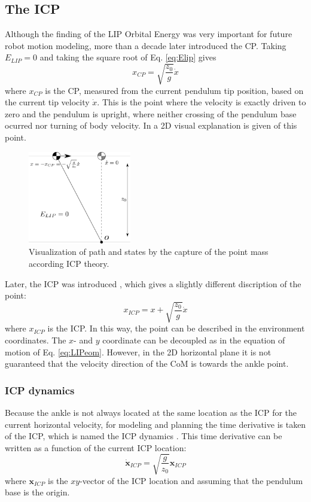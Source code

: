 \subsection{The \acf{ICP}}
Although the finding of the \ac{LIP} Orbital Energy was very important for future robot motion modeling, more than a decade later \cite{pratt2006capture} introduced the \ac{CP}. Taking $E_{LIP}=0$ and taking the square root of Eq.  \eqref{eq:Elip} gives
\begin{equation}
x_{CP}=\sqrt{ \frac{z_0}{g}}\dot{x} 
\label{eq:cp}
\end{equation}
where $x_{CP}$ is the \ac{CP}, measured from the current pendulum tip position, based on the current tip velocity $\dot{x}$. This is the point where the velocity is exactly driven to zero and the pendulum is upright, where neither crossing of the pendulum base ocurred nor turning of body velocity. In  a \ac{2D} visual explanation is given of this point.
\begin{figure}[h]
\centering
\includegraphics[width=0.4\textwidth]{STYLESTUFF/2DICP.png}
\caption{Visualization of path and states by the capture of the point mass according \ac{ICP} theory.}
\label{fig:2dicp}
\end{figure}
Later, the \ac{ICP} was introduced \cite{koolen2012capturability}, which gives a slightly different discription of the point:
\begin{equation}
x_{ICP}=x+\sqrt{ \frac{z_0}{g}}\dot{x} 
\label{eq:icp}
\end{equation}
where $x_{ICP}$ is the \ac{ICP}. In this way, the point can be described in the environment coordinates.
The $x$- and $y$ coordinate can be decoupled as in the equation of motion of Eq. \eqref{eq:LIPeom}. However, in the \ac{2D} horizontal plane it is not guaranteed that the velocity direction of the \ac{CoM} is towards the ankle point. 
\subsubsection{\ac{ICP} dynamics}
Because the ankle is not always located at the same location as the \ac{ICP} for the current horizontal velocity, for modeling and planning the time derivative is taken of the \ac{ICP}, which is named the \ac{ICP} dynamics \cite{koolen2012capturability}. This time derivative can be written as a function of the current \ac{ICP} location:
\begin{equation}
\boldsymbol{\dot{x}}_{ICP}=\sqrt{ \frac{g}{z_0}}\boldsymbol{x}_{ICP} 
\label{eq:cp}
\end{equation}
where $\boldsymbol{x}_{ICP}$ is the $xy$-vector of the \ac{ICP} location and assuming that the pendulum base is the origin.

